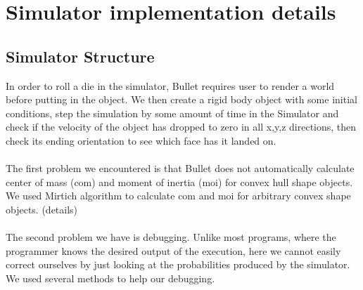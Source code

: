 \section{Simulator implementation details}

\subsection{Simulator Structure}
In order to roll a die in the simulator, Bullet requires user to render a world before putting in the object. We then create a rigid body object with some initial conditions, step the simulation by some amount of time in the Simulator and check if the velocity of the object has dropped to zero in all x,y,z directions, then check its ending orientation to see which face has it landed on.\\\\
The first problem we encountered is that Bullet does not automatically calculate center of mass (com) and moment of inertia (moi) for convex hull shape objects. We used Mirtich algorithm to calculate com and moi for arbitrary convex shape objects. (details)\\\\
The second problem we have is debugging. Unlike most programs, where the programmer knows the desired output of the execution, here we cannot easily correct ourselves by just looking at the probabilities produced by the simulator. We used several methods to help our debugging.\\

